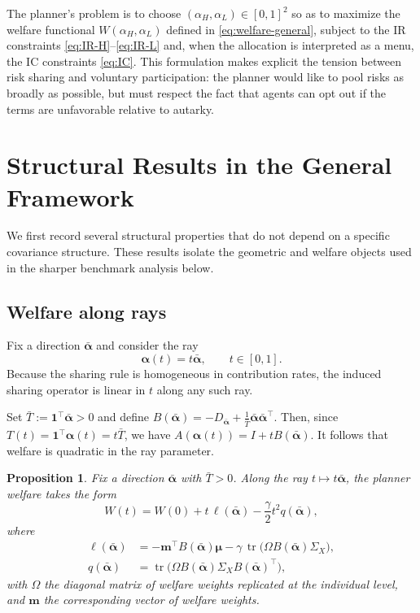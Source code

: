 \documentclass[a4paper,12pt]{article}
\newtheorem{proposition}[theorem]{Proposition}
\theoremstyle{definition}
\theoremstyle{remark}
\newcommand{\1}{\mathbf{1}}
\begin{document}
The planner's problem is to choose \((\alpha_H,\alpha_L)\in[0,1]^2\) so as to maximize the welfare functional \(W(\alpha_H,\alpha_L)\) defined in \eqref{eq:welfare-general}, subject to the IR constraints \eqref{eq:IR-H}--\eqref{eq:IR-L} and, when the allocation is interpreted as a menu, the IC constraints \eqref{eq:IC}. This formulation makes explicit the tension between risk sharing and voluntary participation: the planner would like to pool risks as broadly as possible, but must respect the fact that agents can opt out if the terms are unfavorable relative to autarky.


\section{Structural Results in the General Framework}\label{sec:general-results}

We first record several structural properties that do not depend on a specific covariance structure. These results isolate the geometric and welfare objects used in the sharper benchmark analysis below.

\subsection{Welfare along rays}

Fix a direction \(\bar{\boldsymbol{\alpha}}\) and consider the ray
\[
\boldsymbol{\alpha}(t)=t\bar{\boldsymbol{\alpha}},
\qquad t\in[0,1].
\]
Because the sharing rule is homogeneous in contribution rates, the induced sharing operator is linear in \(t\) along any such ray.

Set \(\bar T:=\1^\top\bar{\boldsymbol{\alpha}}>0\) and define
\(B(\bar{\boldsymbol{\alpha}})
=
- D_{\bar{\boldsymbol{\alpha}}}
+
\frac{1}{\bar T}\bar{\boldsymbol{\alpha}}\bar{\boldsymbol{\alpha}}^\top\).
Then, since \(T(t)=\1^\top\boldsymbol{\alpha}(t)=t\bar T\), we have
\(A(\boldsymbol{\alpha}(t))=I+tB(\bar{\boldsymbol{\alpha}})\).
It follows that welfare is quadratic in the ray parameter.

\begin{proposition}\label{prop:ray-welfare-general}
Fix a direction \(\bar{\boldsymbol{\alpha}}\) with \(\bar T>0\). Along the ray \(t\mapsto t\bar{\boldsymbol{\alpha}}\), the planner welfare takes the form
\[
W(t)=W(0)+t\,\ell(\bar{\boldsymbol{\alpha}})-\frac{\gamma}{2}t^2 q(\bar{\boldsymbol{\alpha}}),
\]
where
\begin{align*}
\ell(\bar{\boldsymbol{\alpha}})
&=
-\mathbf m^\top B(\bar{\boldsymbol{\alpha}})\boldsymbol{\mu}
-
\gamma\,\operatorname{tr}\!\big(\Omega B(\bar{\boldsymbol{\alpha}})\Sigma_X\big),\\[4pt]
q(\bar{\boldsymbol{\alpha}})
&=
\operatorname{tr}\!\big(\Omega B(\bar{\boldsymbol{\alpha}})\Sigma_X B(\bar{\boldsymbol{\alpha}})^\top\big),
\end{align*}
with \(\Omega\) the diagonal matrix of welfare weights replicated at the individual level, and \(\mathbf m\) the corresponding vector of welfare weights.
\end{proposition}
\end{document}
